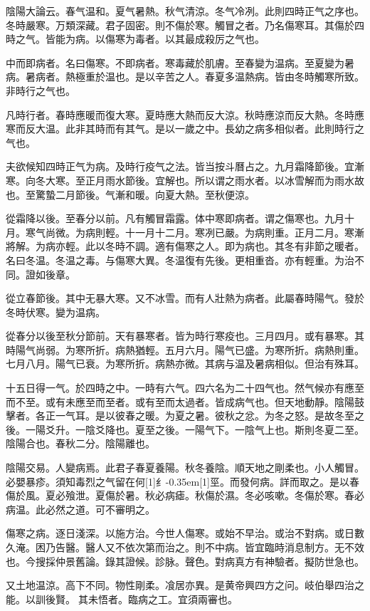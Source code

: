\documentclass[11pt,oneside,b5paper]{ctexbook}
\begin{document}
\begin{flushleft}
陰陽大論云。春气温和。夏气暑熱。秋气清涼。冬气冷冽。此則四時正气之序也。冬時嚴寒。万類深藏。君子固密。則不傷於寒。觸冒之者。乃名傷寒耳。其傷於四時之气。皆能为病。以傷寒为毒者。以其最成殺厉之气也。

中而即病者。名曰傷寒。不即病者。寒毒藏於肌膚。至春變为温病。至夏變为暑病。暑病者。熱極重於温也。是以辛苦之人。春夏多温熱病。皆由冬時觸寒所致。非時行之气也。

凡時行者。春時應暖而復大寒。夏時應大熱而反大涼。秋時應涼而反大熱。冬時應寒而反大温。此非其時而有其气。是以一歲之中。長幼之病多相似者。此則時行之气也。

夫欲候知四時正气为病。及時行疫气之法。皆当按斗曆占之。九月霜降節後。宜漸寒。向冬大寒。至正月雨水節後。宜解也。所以谓之雨水者。以冰雪解而为雨水故也。至驚蟄二月節後。气漸和暖。向夏大熱。至秋便涼。

從霜降以後。至春分以前。凡有觸冒霜露。体中寒即病者。谓之傷寒也。九月十月。寒气尚微。为病則輕。十一月十二月。寒冽已嚴。为病則重。正月二月。寒漸將解。为病亦輕。此以冬時不調。適有傷寒之人。即为病也。其冬有非節之暖者。名曰冬温。冬温之毒。与傷寒大異。冬温復有先後。更相重沓。亦有輕重。为治不同。證如後章。

從立春節後。其中无暴大寒。又不冰雪。而有人壯熱为病者。此屬春時陽气。發於冬時伏寒。變为温病。

從春分以後至秋分節前。天有暴寒者。皆为時行寒疫也。三月四月。或有暴寒。其時陽气尚弱。为寒所折。病熱猶輕。五月六月。陽气已盛。为寒所折。病熱則重。七月八月。陽气已衰。为寒所折。病熱亦微。其病与温及暑病相似。但治有殊耳。

十五日得一气。於四時之中。一時有六气。四六名为二十四气也。然气候亦有應至而不至。或有未應至而至者。或有至而太過者。皆成病气也。但天地動靜。陰陽鼓擊者。各正一气耳。是以彼春之暖。为夏之暑。彼秋之忿。为冬之怒。是故冬至之後。一陽爻升。一陰爻降也。夏至之後。一陽气下。一陰气上也。斯則冬夏二至。陰陽合也。春秋二分。陰陽離也。

陰陽交易。人變病焉。此君子春夏養陽。秋冬養陰。順天地之剛柔也。小人觸冒。必嬰暴疹。須知毒烈之气留在何{\hbox{\scalebox{0.68}[1]{纟}\kern-0.35em\scalebox{0.64}[1]{巠}}}。而發何病。詳而取之。是以春傷於風。夏必飱泄。夏傷於暑。秋必病瘧。秋傷於濕。冬必咳嗽。冬傷於寒。春必病温。此必然之道。可不審明之。

傷寒之病。逐日淺深。以施方治。今世人傷寒。或始不早治。或治不對病。或日數久淹。困乃告醫。醫人又不依次第而治之。則不中病。皆宜臨時消息制方。无不效也。今搜採仲景舊論。錄其證候。診脉。聲色。對病真方有神驗者。擬防世急也。

又土地温涼。高下不同。物性剛柔。飡居亦異。是黄帝興四方之问。岐伯舉四治之能。以訓後賢。{𫔭}其未悟者。臨病之工。宜須兩審也。


\end{flushleft}
\end{document}
